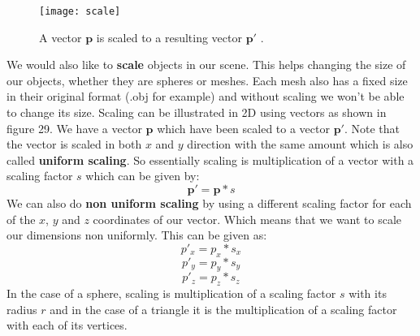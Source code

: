 \documentclass[11pt,a4paper]{article}
\begin{document}
	\begin{figure}
		\texttt{[image: scale]} 
		\caption{A vector $\boldsymbol{p}$ is scaled to a resulting vector $\boldsymbol{p'}$ \protect\cite{2dtransformations}.}
		\label{fig:scale}
	\end{figure}
	We would also like to \textbf{scale} objects in our scene. This helps changing the size of our objects, whether they are spheres or meshes. Each mesh also has a fixed size in their original format (.obj for example) and without scaling we won't be able to change its size. Scaling can be illustrated in 2D using vectors as shown in figure 29. We have a vector $\boldsymbol{p}$ which have been scaled to a vector $\boldsymbol{p'}$. Note that the vector is scaled in both $x$ and $y$ direction with the same amount which is also called \textbf{uniform scaling}. So essentially scaling is multiplication of a vector with a scaling factor $s$ which can be given by:
	\begin{equation}
		\boldsymbol{p'} = \boldsymbol{p}*s
	\end{equation}
	We can also do \textbf{non uniform scaling} by using a different scaling factor for each of the $x$, $y$ and $z$ coordinates of our vector. Which means that we want to scale our dimensions non uniformly. This can be given as:
	\begin{equation}
		p'_{x} = p_{x}*s_{x}
	\end{equation}
	\begin{equation}
		p'_{y} = p_{y}*s_{y}
	\end{equation}
	\begin{equation}
		p'_{z} = p_{z}*s_{z}
	\end{equation}
	In the case of a sphere, scaling is multiplication of a scaling factor $s$ with its radius $r$ and in the case of a triangle it is the multiplication of a scaling factor with each of its vertices.
	
\end{document}
